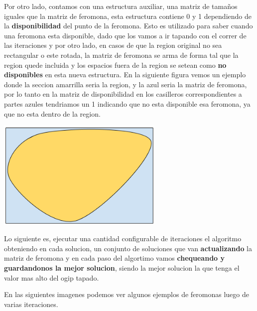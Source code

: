 Por otro lado, contamos con una estructura auxiliar, una matriz de tamaños iguales que la matriz de feromona, esta estructura contiene 0 y 1 dependiendo de la \textbf{disponibilidad} del punto de la feromona. Esto es utilizado para saber cuando una feromona esta disponible, dado que los vamos a ir tapando con el correr de las iteraciones y por otro lado, en casos de que la region original no sea rectangular o este rotada, la matriz de feromona se arma de forma tal que la region quede incluida y los espacios fuera de la region se setean como \textbf{no disponibles} en esta nueva estructura. En la siguiente figura vemos un ejemplo donde la seccion amarrilla seria la region, y la azul seria la matriz de feromona, por lo tanto en la matriz de disponibilidad en los casilleros correspondientes a partes azules tendriamos un 1 indicando que no esta disponible esa feromona, ya que no esta dentro de la region.

\begin{center}
\includegraphics[width=8cm]{imagenes/ejemplo1}
\end{center}


Lo siguiente es, ejecutar una cantidad configurable de iteraciones el algoritmo obteniendo en cada solucion, un conjunto de soluciones que van \textbf{actualizando} la matriz de feromona y en cada paso del algortimo vamos \textbf{chequeando y guardandonos la mejor solucion}, siendo la mejor solucion la que tenga el valor mas alto del ogip tapado. 

En las siguientes imagenes podemos ver algunos ejemplos de feromonas luego de varias iteraciones.

